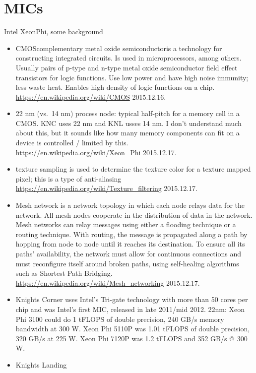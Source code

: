 \documentclass[12pt,twoside]{article}
\begin{document}
\section*{MICs}
Intel XeonPhi, some background
\begin{itemize}
\item CMOS\textemdash complementary metal oxide semiconductor\textemdash is a technology for constructing integrated circuits. Is used in microprocessors, among others. Usually pairs of p-type and n-type metal oxide semiconductor field effect transistors for logic functions. Use low power and have high noise immunity; less waste heat. Enables high density of logic functions on a chip. \href{https://en.wikipedia.org/wiki/CMOS}{https://en.wikipedia.org/wiki/CMOS} 2015.12.16.

\item 22 nm (vs.\ 14 nm) process node: typical half-pitch for a memory cell in a CMOS. KNC uses 22 nm and KNL usses 14 nm. I don't understand much about this, but it sounds like how many memory components can fit on a device is controlled / limited by this. \href{https://en.wikipedia.org/wiki/Xeon_Phi}{https://en.wikipedia.org/wiki/Xeon_Phi} 2015.12.17.

\item texture sampling is used to determine the texture color for a texture mapped pixel; this is a type of anti-aliasing \href{https://en.wikipedia.org/wiki/Texture_filtering}{https://en.wikipedia.org/wiki/Texture_filtering} 2015.12.17.

\item Mesh network is a network topology in which each node relays data for the network. All mesh nodes cooperate in the distribution of data in the network. Mesh networks can relay messages using either a flooding technique or a routing technique. With routing, the message is propagated along a path by hopping from node to node until it reaches its destination. To ensure all its paths' availability, the network must allow for continuous connections and must reconfigure itself around broken paths, using self-healing algorithms such as Shortest Path Bridging. \href{https://en.wikipedia.org/wiki/Mesh_networking}{https://en.wikipedia.org/wiki/Mesh_networking} 2015.12.17.

\item Knights Corner uses Intel's Tri-gate technology with more than 50 cores per chip and was Intel's first MIC, released in late 2011/mid 2012. 22nm: Xeon Phi 3100 could do 1 tFLOPS of double precision, 240 GB/s memory bandwidth at 300 W. Xeon Phi 5110P was 1.01 tFLOPS of double precision, 320 GB/s at 225 W. Xeon Phi 7120P was 1.2 tFLOPS and 352 GB/s @ 300 W.

\item Knights Landing 

\end{itemize}
\end{document}

